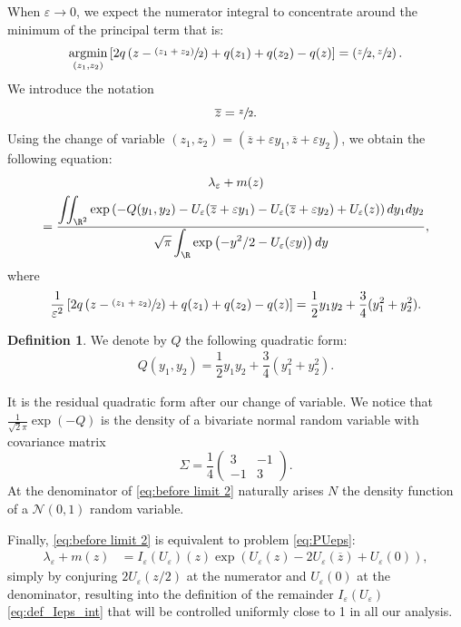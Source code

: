 \documentclass[JEP,XML,SOM,Unicode]{cedram}
\let\mathcal\mathscr
\newcommand{\psfrac}[2]{\sfrac{(#1)}{#2}}
\newcommand{\cN}{\mathcal{N}}
\theoremstyle{plain}
\theoremstyle{definition}
\newtheorem{definition}[thm]{Definition}
\let\eps\varepsilon
\let\ds\displaystyle
\newcommand{\bz}{\overline{z}}
\DeclareMathOperator*{\argmin}{argmin}
\begin{document}
When $\eps\to 0$, we expect the numerator integral to concentrate around the minimum of the principal term that is:
\[ \argmin_{(z_1,z_2)} \left[ 2q \left(z-\psfrac{z_1+z_2}{2} \right) + q(z_1) + q(z_2) - q(z) \right] = \left(\sfrac{z}{2}, \sfrac{z}{2}\right).\]
We introduce the notation
\[ \overline{z} = \sfrac{z}{2}.\]
Using the change of variable $(z_1,z_2) = (\bz + \eps y_1, \bz + \eps y_2) $, we obtain the following equation:
\begin{multline}\label{eq:before limit 2}
\lambda_\eps + m(z)\\
= \dfrac{\displaystyle \iint_{\R^2} \exp\left(-Q(y_1,y_2) - U_\eps(\bz+\eps y_1) - U_\eps(\bz+\eps y_2) + U_\eps(z) \right) d y_1 d y_2}{\ds
\sqrt{\pi} \int_\R \exp\left(- {y^2}/{2} - U_\eps(\eps y) \right) d y},
\end{multline}
where
\begin{equation*}
\dfrac{1}{\eps^2} \left[ 2q \left(z-\psfrac{z_1+z_2}{2} \right) + q(z_1) + q(z_2) - q(z) \right] = \dfrac{1}{2}y_1y_2 + \dfrac{3}{4}(y_1^2+y_2^2).
\end{equation*}
\begin{definition}
We denote by $Q$ the following quadratic form:
\begin{align*}
Q(y_1,y_2) = \dfrac{1}{2}y_1y_2 + \dfrac{3}{4}(y_1^2+y_2^2).
\end{align*}
\end{definition}
It is the residual quadratic form after our change of variable. We notice that $\frac{1}{\sqrt{2}\pi}\exp(-Q)$ is the density of a bivariate normal random variable with covariance matrix
\begin{equation}\label{eq:covariance}
\Sigma =\frac14 \begin{pmatrix}
3 & -1 \\ -1& 3
\end{pmatrix}.
\end{equation}
At the denominator of \eqref{eq:before limit 2} naturally arises $N$ the density function of a $\cN(0,1)$ random variable.

Finally, \eqref{eq:before limit 2} is equivalent to problem \eqref{eq:PUeps}:
\begin{align*}
\lambda_\eps + m(z) & = I_\eps(U_\eps)(z) \exp \left(U_\eps(z)-2U_\eps\left(\bz\right) + U_\eps(0) \right),
\end{align*}
simply by conjuring $2 U_\eps(z/2)$ at the numerator and $U_\eps(0)$ at the denominator, resulting into the definition of the remainder $I_\eps(U_\eps)$ \eqref{eq:def_Ieps_int} that will be controlled uniformly close to 1 in all our analysis.
\end{document}
